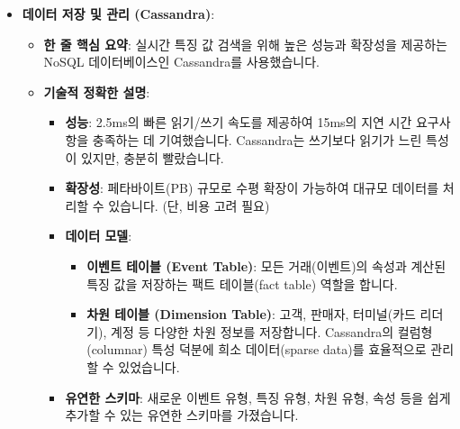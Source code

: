 \documentclass[11pt,a4paper]{article}
\theoremstyle{definition}
\begin{document}
\begin{itemize}
\begin{itemize}
\begin{itemize}
\begin{itemize}
\begin{itemize}
    \item \textbf{데이터 저장 및 관리 (Cassandra)}:
    \begin{itemize}
        \item \textbf{한 줄 핵심 요약}: 실시간 특징 값 검색을 위해 높은 성능과 확장성을 제공하는 NoSQL 데이터베이스인 Cassandra를 사용했습니다.
        \item \textbf{기술적 정확한 설명}:
        \begin{itemize}
            \item \textbf{성능}: 2.5ms의 빠른 읽기/쓰기 속도를 제공하여 15ms의 지연 시간 요구사항을 충족하는 데 기여했습니다. Cassandra는 쓰기보다 읽기가 느린 특성이 있지만, 충분히 빨랐습니다.
            \item \textbf{확장성}: 페타바이트(PB) 규모로 수평 확장이 가능하여 대규모 데이터를 처리할 수 있습니다. (단, 비용 고려 필요)
            \item \textbf{데이터 모델}:
            \begin{itemize}
                \item \textbf{이벤트 테이블 (Event Table)}: 모든 거래(이벤트)의 속성과 계산된 특징 값을 저장하는 팩트 테이블(fact table) 역할을 합니다.
                \item \textbf{차원 테이블 (Dimension Table)}: 고객, 판매자, 터미널(카드 리더기), 계정 등 다양한 차원 정보를 저장합니다. Cassandra의 컬럼형(columnar) 특성 덕분에 희소 데이터(sparse data)를 효율적으로 관리할 수 있었습니다.
            \end{itemize}
            \item \textbf{유연한 스키마}: 새로운 이벤트 유형, 특징 유형, 차원 유형, 속성 등을 쉽게 추가할 수 있는 유연한 스키마를 가졌습니다.
        \end{itemize}
    \end{itemize}


\end{itemize}
\end{itemize}
\end{itemize}
\end{itemize}
\end{itemize}
\end{document}
